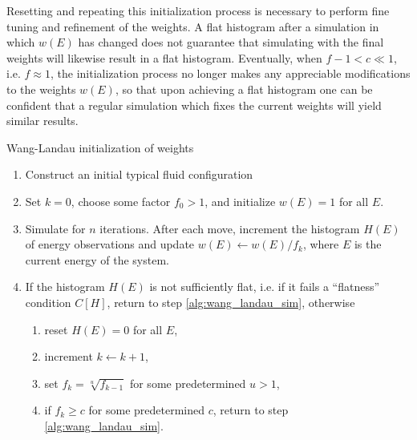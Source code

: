 \documentclass[11pt]{article}
\newcommand{\p}[1]{\left(#1\right)} %
\renewcommand{\sp}[1]{\left[#1\right]} %
\newenvironment{alg}
{\hrulefill\begin{enumerate}}
{\end{enumerate}\hrulefill}
\begin{document}
Resetting and repeating this initialization process is necessary to
perform fine tuning and refinement of the weights. A flat histogram
after a simulation in which $w\p{E}$ has changed does not guarantee
that simulating with the final weights will likewise result in a flat
histogram. Eventually, when $f-1<c\ll 1$, i.e. $f\approx 1$, the
initialization process no longer makes any appreciable modifications
to the weights $w\p{E}$, so that upon achieving a flat histogram one
can be confident that a regular simulation which fixes the current
weights will yield similar results.

\begin{algorithm}[!b]
  \caption{Wang-Landau initialization of weights}
  \label{alg:wang_landau}
  \begin{alg}

  \item Construct an initial typical fluid configuration

  \item Set $k=0$, choose some factor $f_0>1$, and initialize
    $w\p{E}=1$ for all $E$.

  \item Simulate for $n$ iterations. After each move, increment the
    histogram $H\p{E}$ of energy observations and update
    $w\p{E}\leftarrow w\p{E}/f_k$, where $E$ is the current energy of
    the system.
    \label{alg:wang_landau_sim}

  \item If the histogram $H\p{E}$ is not sufficiently flat, i.e. if it
    fails a ``flatness'' condition $C\sp{H}$, return to step
    \ref{alg:wang_landau_sim}, otherwise
    \begin{enumerate}
    \item reset $H\p{E}=0$ for all $E$,
    \item increment $k\leftarrow k+1$,
    \item set $f_k=\sqrt[u]{f_{k-1}}$ for some predetermined $u>1$,
      \label{alg:wang_landau_update}
    \item if $f_k\ge c$ for some predetermined $c$, return to step
      \ref{alg:wang_landau_sim}.
    \end{enumerate}

  \end{alg}
\end{algorithm}
\end{document}
